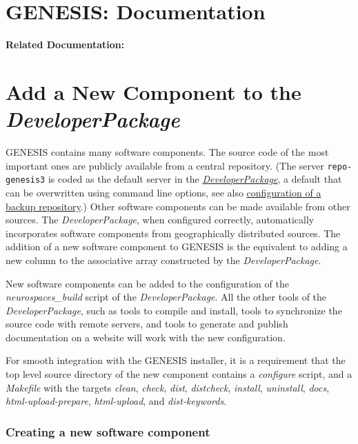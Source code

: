 \documentclass[12pt]{article}
\begin{document}
\section*{GENESIS: Documentation}

{\bf Related Documentation:}

\section*{Add a New Component to the {\it DeveloperPackage}}

GENESIS contains many software components. The source code of the most
important ones are publicly available from a central repository. (The
server {\tt repo-genesis3} is coded as the default server in the
\href{../developer-package/developer-package.tex}{\it
  DeveloperPackage}, a default that can be overwritten using command
line options, see also
\href{../backup-repository/backup-repository.tex}{configuration of a
  backup repository}.) Other software components can be made available
from other sources. The {\it DeveloperPackage}, when configured
correctly, automatically incorporates software components from
geographically distributed sources. The addition of a new software
component to GENESIS is the equivalent to adding a new column to the
associative array constructed by the {\it DeveloperPackage}.

New software components can be added to the configuration of the {\it
  neurospaces\_build} script of the {\it DeveloperPackage}. All the other tools of the
{\it DeveloperPackage}, such as tools to compile and install, tools to synchronize
the source code with remote servers, and tools to generate and publish
documentation on a website will work with the new configuration.

For smooth integration with the GENESIS installer, it is a requirement that the top level source directory of the new component contains a {\it configure} script, and a {\it Makefile} with the targets {\it clean}, {\it check}, {\it dist}, {\it distcheck}, {\it install}, {\it uninstall}, {\it docs}, {\it html-upload-prepare}, {\it html-upload}, and {\it dist-keywords}.

\subsubsection*{Creating a new software component}
\end{document}
